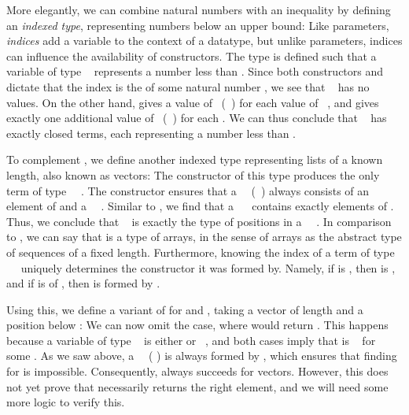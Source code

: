 More elegantly, we can combine natural numbers with an inequality by defining an \emph{indexed type}, representing numbers below an upper bound:
Like parameters, \emph{indices} add a variable to the context of a datatype, but unlike parameters, indices can influence the availability of constructors. The type  is defined such that a variable of type \  represents a number less than . Since both constructors  and  dictate that the index is the  of some natural number , we see that \  has no values. On the other hand,  gives a value of \ (\ ) for each value of \ , and  gives exactly one additional value of \ (\ ) for each . We can thus conclude that \  has exactly  closed terms, each representing a number less than .

To complement , we define another indexed type representing lists of a known length, also known as vectors:
The \AIC{[]} constructor of this type produces the only term of type \ \ . The  constructor ensures that a \ \ (\ ) always consists of an element of  and a \ \ . Similar to , we find that a \ \  contains exactly  elements of . Thus, we conclude that \  is exactly the type of positions in a \ \ . In comparison to , we can say that  is a type of arrays, in the sense of arrays as the abstract type of sequences of a fixed length. Furthermore, knowing the index of a term  of type \ \  uniquely determines the constructor it was formed by. Namely, if  is , then  is \AIC{[]}, and if  is  of , then  is formed by . 

Using this, we define a variant of  for  and , taking a vector of length  and a position below :
We can now omit the \AIC{[]} case, where  would return . This happens because a variable of type \  is either  or \ , and both cases imply that  is \  for some . As we saw above, a \ \ ( ) is always formed by , which ensures that finding \AIC{[]} for  is impossible. Consequently,  always succeeds for vectors. However, this does not yet prove that  necessarily returns the right element, and we will need some more logic to verify this.

